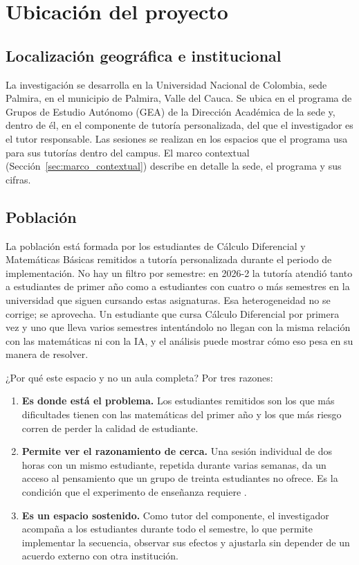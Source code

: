 \section{Ubicación del proyecto}
\label{sec:ubicacion_proyecto}

\subsection{Localización geográfica e institucional}

La investigación se desarrolla en la Universidad Nacional de Colombia, sede Palmira, en el municipio de Palmira, Valle del Cauca. Se ubica en el programa de Grupos de Estudio Autónomo (GEA) de la Dirección Académica de la sede y, dentro de él, en el componente de tutoría personalizada, del que el investigador es el tutor responsable. Las sesiones se realizan en los espacios que el programa usa para sus tutorías dentro del campus. El marco contextual (Sección~\ref{sec:marco_contextual}) describe en detalle la sede, el programa y sus cifras.

\subsection{Población}

La población está formada por los estudiantes de Cálculo Diferencial y Matemáticas Básicas remitidos a tutoría personalizada durante el periodo de implementación. No hay un filtro por semestre: en 2026-2 la tutoría atendió tanto a estudiantes de primer año como a estudiantes con cuatro o más semestres en la universidad que siguen cursando estas asignaturas. Esa heterogeneidad no se corrige; se aprovecha. Un estudiante que cursa Cálculo Diferencial por primera vez y uno que lleva varios semestres intentándolo no llegan con la misma relación con las matemáticas ni con la IA, y el análisis puede mostrar cómo eso pesa en su manera de resolver.

¿Por qué este espacio y no un aula completa? Por tres razones:

\begin{enumerate}
\item \textbf{Es donde está el problema.} Los estudiantes remitidos son los que más dificultades tienen con las matemáticas del primer año y los que más riesgo corren de perder la calidad de estudiante.

\item \textbf{Permite ver el razonamiento de cerca.} Una sesión individual de dos horas con un mismo estudiante, repetida durante varias semanas, da un acceso al pensamiento que un grupo de treinta estudiantes no ofrece. Es la condición que el experimento de enseñanza requiere \parencite{steffe2000teaching}.

\item \textbf{Es un espacio sostenido.} Como tutor del componente, el investigador acompaña a los estudiantes durante todo el semestre, lo que permite implementar la secuencia, observar sus efectos y ajustarla sin depender de un acuerdo externo con otra institución.
\end{enumerate}

